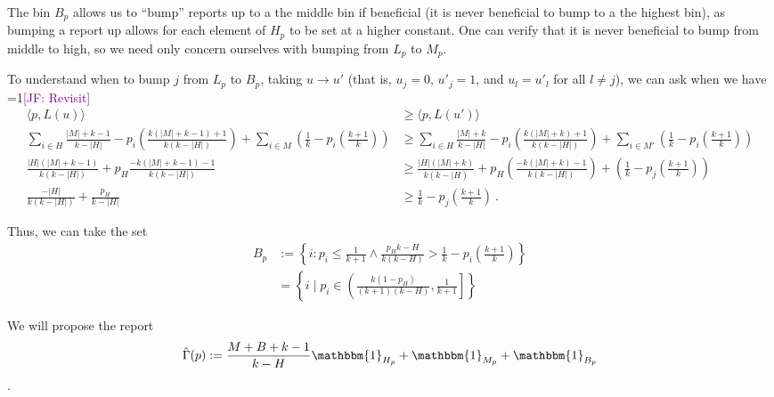 \documentclass[12pt]{article}
\newcommand{\Comments}{1}
\newcommand{\mynote}[2]{\ifnum\Comments=1\textcolor{#1}{#2}\fi}
\newcommand{\jessie}[1]{\mynote{purple}{[JF: #1]}}
\newcommand{\simplex}{\Delta_\Y}
\newcommand{\Y}{\mathcal{Y}}
\newcommand{\inprod}[2]{\langle #1, #2 \rangle}%
\newcommand{\ones}{\mathbbm{1}}
\begin{document}
The bin $B_p$ allows us to ``bump'' reports up to a the middle bin if beneficial (it is never beneficial to bump to a the highest bin), as bumping a report up allows for each element of $H_p$ to be set at a higher constant.
One can verify that it is never beneficial to bump from middle to high, so we need only concern ourselves with bumping from $L_p$ to $M_p$.

To understand when to bump $j$ from $L_p$ to $B_p$, taking $u \to u'$ (that is, $u_j = 0$, $u'_j = 1$, and $u_l = u'_l$ for all $l \neq j$), we can ask when we have \jessie{Revisit}
\begin{align*}
\inprod{p}{L(u)} &\geq \inprod{p}{L(u')}\\
\sum_{i \in H} \frac{|M| + k -1}{k-|H|} - p_i \left(\frac{k(|M| + k -1)+ 1}{k(k- |H|)}\right) + \sum_{i \in M} \left(\frac 1 k - p_i \left( \frac {k+1}{k}\right)\right) &\geq \sum_{i \in H} \frac{|M| + k }{k-|H|} - p_i \left(\frac{k(|M| + k)+ 1}{k(k- |H|)}\right) + \sum_{i \in M'} \left(\frac 1 k - p_i \left( \frac {k+1}{k}\right)\right)\\
\frac{|H|(|M| + k - 1)}{k(k- |H|)} + p_H \frac{-k(|M| + k - 1) - 1}{k(k - |H|)} &\geq \frac{|H|(|M| + k)}{k(k - |H)} + p_H \left(\frac{-k(|M| + k)-1}{k (k - |H|)}\right) + \left(\frac 1 k - p_j \left(\frac {k+1}{k}\right)\right) \\
\frac{-|H|}{k (k - |H|)} + \frac{p_H}{k - |H|} &\geq \frac 1 k - p_j \left(\frac{k+1}{k}\right)~.~
\end{align*}

Thus, we can take the set 
\begin{align*}
B_p &:= \left\{i : p_i \leq \frac{1}{k+1} \wedge \frac{p_H k- H}{k(k- H)} > \frac 1 k - p_i\left(\frac{k+1}{k}\right) \right\}\\
&=\left\{i \mid p_i \in \left(\frac {k(1-p_H)}{(k+1)(k-H)}, \frac 1 {k+1} \right]\right\}
\end{align*}


We will propose the report 
\begin{equation}\label{eq:hat-gamma}
\hat \Gamma(p) := \frac{M + B + k - 1}{k-H}\ones_{H_p} + \ones_{M_p} + \ones_{B_p}
\end{equation}.


\end{document}
